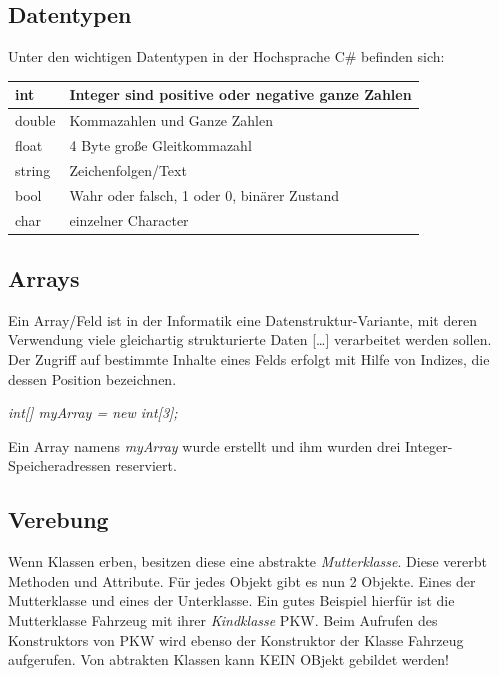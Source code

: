 \documentclass[12pt,a4paper]{article}
\begin{document}
\subsection{Datentypen}
    Unter den wichtigen Datentypen in der Hochsprache C\# befinden sich:
    \begin{table}[h]
    	\renewcommand{\arraystretch}{1.5}
        \centering
        \begin{tabularx}{17cm}{|l|X|}
            \hline
            \cellcolor{cyan!60!white}int & Integer sind positive oder negative ganze Zahlen\\
            \hline
            \cellcolor{cyan!60!white}double & Kommazahlen und Ganze Zahlen\\
            \hline
            \cellcolor{cyan!60!white}float & 4 Byte große Gleitkommazahl\\
            \hline
            \cellcolor{cyan!60!white}string & Zeichenfolgen/Text\\
            \hline
            \cellcolor{cyan!60!white}bool & Wahr oder falsch, 1 oder 0, binärer Zustand\\
            \hline
            \cellcolor{cyan!60!white}char & einzelner Character\\
            \hline
        \end{tabularx}
    \end{table}

\subsection{Arrays}
    Ein Array/Feld ist in der Informatik eine Datenstruktur-Variante, mit deren Verwendung viele gleichartig strukturierte Daten […] verarbeitet werden sollen. Der Zugriff auf bestimmte Inhalte eines Felds erfolgt mit Hilfe von Indizes, die dessen Position bezeichnen.
    \begin{center}
        \textit{int[] myArray = new int[3];}
    \end{center}
    Ein Array namens \textit{myArray} wurde erstellt und ihm wurden drei Integer-Speicheradressen reserviert.

\subsection{Verebung}
    Wenn Klassen erben, besitzen diese eine abstrakte \textit{Mutterklasse}. Diese vererbt Methoden und Attribute. Für jedes Objekt gibt es nun 2 Objekte. Eines der Mutterklasse und eines der Unterklasse. Ein gutes Beispiel hierfür ist die Mutterklasse Fahrzeug mit ihrer \textit{Kindklasse} PKW.
    Beim Aufrufen des Konstruktors von PKW wird ebenso der Konstruktor der Klasse Fahrzeug aufgerufen.
    Von abtrakten Klassen kann KEIN OBjekt gebildet werden!
\end{document}
